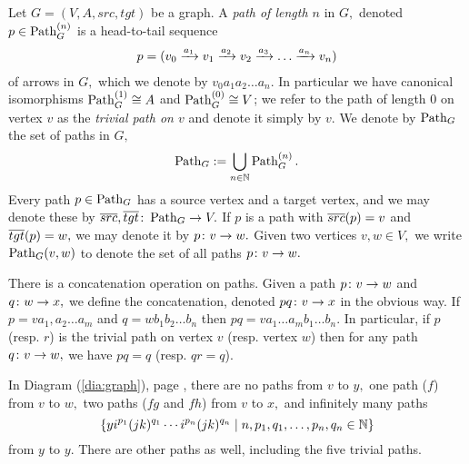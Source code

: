 \documentclass[../main/CT4S-EN-RU]{subfiles}
\begin{document}
\begin{definitionENG}\label{def:paths in graph}
Let $G=(V,A,src,tgt)$ be a graph. A {\em path of length $n$} in $G,$ denoted $p\in\operatorname{Path}_G^{(n)}$ is a head-to-tail sequence \begin{align}\label{dia:path}p=(v_0\xrightarrow{a_1}v_1\xrightarrow{a_2}v_2\xrightarrow{a_3}\ldots\xrightarrow{a_n}v_n)\end{align} of arrows in $G,$ which we denote by $v_0 a_1 a_2 \ldots a_n.$ In particular we have canonical isomorphisms $\operatorname{Path}_G^{(1)}\cong A$ and $\operatorname{Path}_G^{(0)}\cong V$; we refer to the path of length 0 on vertex $v$ as the {\em trivial path on $v$} and denote it simply by $v.$ We denote by $\operatorname{Path}_G$ the set of paths in $G,$ $$\operatorname{Path}_G:=\bigcup_{n\in{\mathbb N}}\operatorname{Path}_G^{(n)}.$$ Every path $p\in\operatorname{Path}_G$ has a source vertex and a target vertex, and we may denote these by $\overline{src},\overline{tgt}\colon\operatorname{Path}_G\rightarrow V.$ If $p$ is a path with $\overline{src}(p)=v$ and $\overline{tgt}(p)=w,$ we may denote it by $p\colon v\rightarrow w.$ Given two vertices $v,w\in V,$ we write $\operatorname{Path}_G(v,w)$ to denote the set of all paths $p\colon v\rightarrow w.$

There is a concatenation operation on paths. Given a path $p\colon v\rightarrow w$ and $q\colon w\rightarrow x,$ we define the concatenation, denoted $p q\colon v\rightarrow x$ in the obvious way. If $p=va_1,a_2\ldots a_m$ and $q= wb_1b_2\ldots b_n$ then $pq=va_1\ldots a_mb_1\ldots b_n.$ In particular, if $p$ (resp. $r$) is the trivial path on vertex $v$ (resp. vertex $w$) then for any path $q\colon v\rightarrow w,$ we have $pq=q$ (resp. $qr=q$). 
\end{definitionENG}

\begin{definitionRUS}\label{def:paths in graph}
\end{definitionRUS}

\begin{exampleENG}
In Diagram (\ref{dia:graph}), page \pageref{dia:graph}, there are no paths from $v$ to $y,$ one path ($f$) from $v$ to $w,$ two paths ($fg$ and $fh$) from $v$ to $x,$ and infinitely many paths $$\{y i^{p_1}(jk)^{q_1}\cdots i^{p_n}(jk)^{q_n}\;|\;n,p_1,q_1,\ldots,p_n,q_n\in{\mathbb N}\}$$ from $y$ to $y.$ There are other paths as well, including the five trivial paths.
\end{exampleENG}

\begin{exampleRUS}
\end{exampleRUS}
\end{document}
